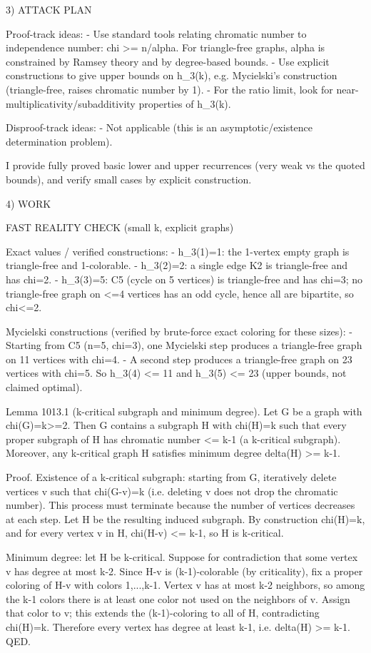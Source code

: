 3) ATTACK PLAN

Proof-track ideas:
- Use standard tools relating chromatic number to independence number: chi >= n/alpha.
  For triangle-free graphs, alpha is constrained by Ramsey theory and by degree-based bounds.
- Use explicit constructions to give upper bounds on h_3(k), e.g. Mycielski's construction (triangle-free, raises chromatic number by 1).
- For the ratio limit, look for near-multiplicativity/subadditivity properties of h_3(k).

Disproof-track ideas:
- Not applicable (this is an asymptotic/existence determination problem).

I provide fully proved basic lower and upper recurrences (very weak vs the quoted bounds), and verify small cases by explicit construction.

4) WORK

FAST REALITY CHECK (small k, explicit graphs)

Exact values / verified constructions:
- h_3(1)=1: the 1-vertex empty graph is triangle-free and 1-colorable.
- h_3(2)=2: a single edge K2 is triangle-free and has chi=2.
- h_3(3)=5: C5 (cycle on 5 vertices) is triangle-free and has chi=3; no triangle-free graph on <=4 vertices has an odd cycle, hence all are bipartite, so chi<=2.

Mycielski constructions (verified by brute-force exact coloring for these sizes):
- Starting from C5 (n=5, chi=3), one Mycielski step produces a triangle-free graph on 11 vertices with chi=4.
- A second step produces a triangle-free graph on 23 vertices with chi=5.
So h_3(4) <= 11 and h_3(5) <= 23 (upper bounds, not claimed optimal).

Lemma 1013.1 (k-critical subgraph and minimum degree).
Let G be a graph with chi(G)=k>=2.
Then G contains a subgraph H with chi(H)=k such that every proper subgraph of H has chromatic number <= k-1 (a k-critical subgraph).
Moreover, any k-critical graph H satisfies minimum degree delta(H) >= k-1.

Proof.
Existence of a k-critical subgraph: starting from G, iteratively delete vertices v such that chi(G-v)=k (i.e. deleting v does not drop the chromatic number). This process must terminate because the number of vertices decreases at each step. Let H be the resulting induced subgraph. By construction chi(H)=k, and for every vertex v in H, chi(H-v) <= k-1, so H is k-critical.

Minimum degree: let H be k-critical. Suppose for contradiction that some vertex v has degree at most k-2.
Since H-v is (k-1)-colorable (by criticality), fix a proper coloring of H-v with colors {1,...,k-1}.
Vertex v has at most k-2 neighbors, so among the k-1 colors there is at least one color not used on the neighbors of v. Assign that color to v; this extends the (k-1)-coloring to all of H, contradicting chi(H)=k.
Therefore every vertex has degree at least k-1, i.e. delta(H) >= k-1.  QED.

